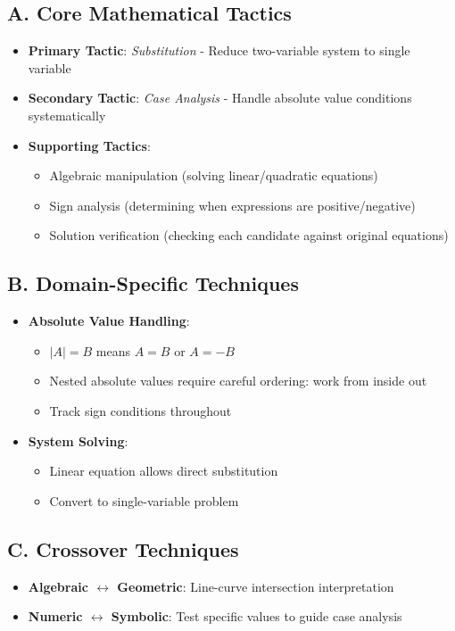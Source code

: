 \documentclass[]{article}
\begin{document}
\begin{tacticalbox}
\subsection*{A. Core Mathematical Tactics}
\begin{itemize}[leftmargin=*]
    \item \textbf{Primary Tactic}: \textit{Substitution} - Reduce two-variable system to single variable
    \item \textbf{Secondary Tactic}: \textit{Case Analysis} - Handle absolute value conditions systematically
    \item \textbf{Supporting Tactics}:
    \begin{itemize}
        \item Algebraic manipulation (solving linear/quadratic equations)
        \item Sign analysis (determining when expressions are positive/negative)
        \item Solution verification (checking each candidate against original equations)
    \end{itemize}
\end{itemize}

\subsection*{B. Domain-Specific Techniques}
\begin{itemize}[leftmargin=*]
    \item \textbf{Absolute Value Handling}:
    \begin{itemize}
        \item $|A| = B$ means $A = B$ or $A = -B$
        \item Nested absolute values require careful ordering: work from inside out
        \item Track sign conditions throughout
    \end{itemize}
    \item \textbf{System Solving}:
    \begin{itemize}
        \item Linear equation allows direct substitution
        \item Convert to single-variable problem
    \end{itemize}
\end{itemize}

\subsection*{C. Crossover Techniques}
\begin{itemize}[leftmargin=*]
    \item \textbf{Algebraic $\leftrightarrow$ Geometric}: Line-curve intersection interpretation
    \item \textbf{Numeric $\leftrightarrow$ Symbolic}: Test specific values to guide case analysis
\end{itemize}
\end{tacticalbox}
\end{document}
